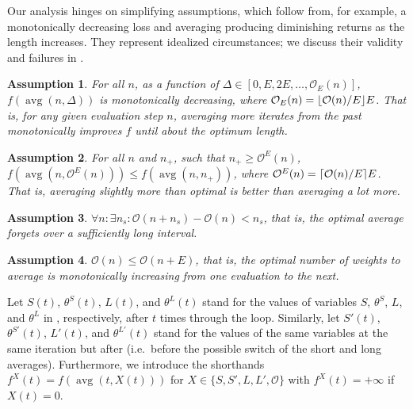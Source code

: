 \documentclass[twocolumn]{article}
\DeclarePairedDelimiter{\ceil}{\lceil}{\rceil}
\DeclarePairedDelimiter{\floor}{\lfloor}{\rfloor}
\DeclareMathOperator*{\avg}{avg}
\newtheorem{assumption}{Assumption}
\newcommand{\OL}{\mathcal{O}}
\begin{document}
Our analysis hinges on simplifying assumptions, which follow from, for example, a monotonically decreasing loss and averaging producing diminishing returns as the length increases.
They represent idealized circumstances; we discuss their validity and failures in .

\begin{assumption}\label{easy-opt}
For all $n$, as a function of $\Delta \in [0, E, 2E, \dots, \OL_E(n)]$, $f(\avg(n,\Delta))$ is monotonically decreasing, where $\OL_E(n)=\floor{\OL(n)/E}E$.
That is, for any given evaluation step $n$, averaging more iterates from the past monotonically improves $f$ until about the optimum length.
\end{assumption}

\begin{assumption}\label{easy-opt2}
For all $n$ and $n_+$, such that $n_+ \geq \OL^E(n)$, $f(\avg(n,\OL^E(n))) \leq f(\avg(n,n_+))$, where $\OL^E(n)=\ceil{\OL(n)/E}E$.
That is, averaging slightly more than optimal is better than averaging a lot more.
\end{assumption}

\begin{assumption}\label{slow-opt}
$\forall n \colon \exists n_s \colon \OL(n+n_s) - \OL(n) < n_s$, that is, the optimal average forgets over a sufficiently long interval.
\end{assumption}

\begin{assumption}\label{monotone-opt}
$\OL(n) \leq \OL(n+E)$, that is, the optimal number of weights to average is monotonically increasing from one evaluation to the next.
\end{assumption}

Let $S(t)$, $\theta^S(t)$, $L(t)$, and $\theta^L(t)$ stand for the values of variables $S$, $\theta^S$, $L$, and $\theta^L$ in , respectively, after $t$ times through the loop.
Similarly, let $S'\!(t)$, $\theta^{S'\!\!}(t)$, $L'\!(t)$, and $\theta^{L'\!\!}(t)$ stand for the values of the same variables at the same iteration but after  (i.e.\ before the possible switch of the short and long averages).
Furthermore, we introduce the shorthands $f^X(t) = f(\avg(t,X(t)))$ for $X \in \{S,S',L,L',\OL\}$ with $f^X(t) = +\infty$ if $X(t)=0$.
\end{document}
